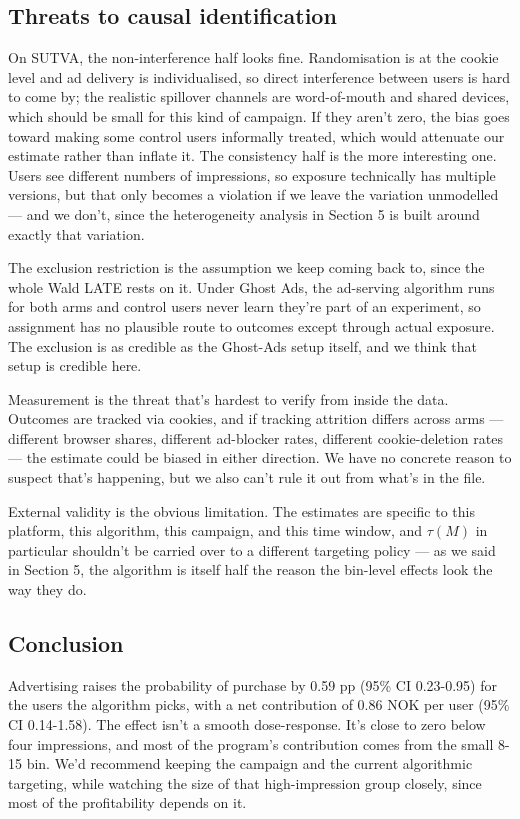 \subsection{Threats to causal identification}

On SUTVA, the non-interference half looks fine. Randomisation is at the
cookie level and ad delivery is individualised, so direct interference
between users is hard to come by; the realistic spillover channels are
word-of-mouth and shared devices, which should be small for this kind of
campaign. If they aren't zero, the bias goes toward making some control
users informally treated, which would attenuate our estimate rather than
inflate it. The consistency half is the more interesting one. Users see
different numbers of impressions, so exposure technically has multiple
versions, but that only becomes a violation if we leave the variation
unmodelled --- and we don't, since the heterogeneity analysis in Section
5 is built around exactly that variation.

The exclusion restriction is the assumption we keep coming back to,
since the whole Wald LATE rests on it. Under Ghost Ads, the ad-serving
algorithm runs for both arms and control users never learn they're part
of an experiment, so assignment has no plausible route to outcomes
except through actual exposure. The exclusion is as credible as the
Ghost-Ads setup itself, and we think that setup is credible here.

Measurement is the threat that's hardest to verify from inside the data.
Outcomes are tracked via cookies, and if tracking attrition differs
across arms --- different browser shares, different ad-blocker rates,
different cookie-deletion rates --- the estimate could be biased in
either direction. We have no concrete reason to suspect that's
happening, but we also can't rule it out from what's in the file.

External validity is the obvious limitation. The estimates are specific
to this platform, this algorithm, this campaign, and this time window,
and \(\tau(M)\) in particular shouldn't be carried over to a different
targeting policy --- as we said in Section 5, the algorithm is itself
half the reason the bin-level effects look the way they do.

\subsection{Conclusion}

Advertising raises the probability of purchase by 0.59 pp (95\% CI
0.23-0.95) for the users the algorithm picks, with a net contribution of
0.86 NOK per user (95\% CI 0.14-1.58). The effect isn't a smooth
dose-response. It's close to zero below four impressions, and most of
the program's contribution comes from the small 8-15 bin. We'd recommend
keeping the campaign and the current algorithmic targeting, while
watching the size of that high-impression group closely, since most of
the profitability depends on it.

